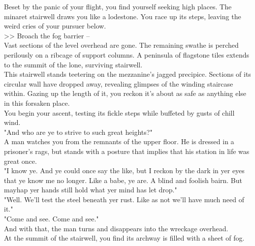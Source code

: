 Beset by the panic of your flight, you find yourself seeking high places. The minaret stairwell draws you like a lodestone. You race up its steps, leaving the weird cries of your pursuer below.\\



>> Broach the fog barrier -- \\


Vast sections of the level overhead are gone. The remaining swathe is perched perilously on a ribcage of support columns. A peninsula of flagstone tiles extends to the summit of the lone, surviving stairwell.\\

This stairwell stands teetering on the mezzanine's jagged precipice. Sections of its circular wall have dropped away, revealing glimpses of the winding staircase within. Gazing up the length of it, you reckon it's about as safe as anything else in this forsaken place.\\

You begin your ascent, testing its fickle steps while buffeted by gusts of chill wind.\\

"And who are ye to strive to such great heights?"\\

A man watches you from the remnants of the upper floor. He is dressed in a prisoner's rags, but stands with a posture that implies that his station in life was great once.\\

"I know ye. And ye could once say the like, but I reckon by the dark in yer eyes that ye know me no longer. Like a babe, ye are. A blind and foolish bairn. But mayhap yer hands still hold what yer mind has let drop."\\

"Well. We'll test the steel beneath yer rust. Like as not we'll have much need of it."\\

"Come and see. Come and see."\\

And with that, the man turns and disappears into the wreckage overhead.\\

At the summit of the stairwell, you find its archway is filled with a sheet of fog.\\
